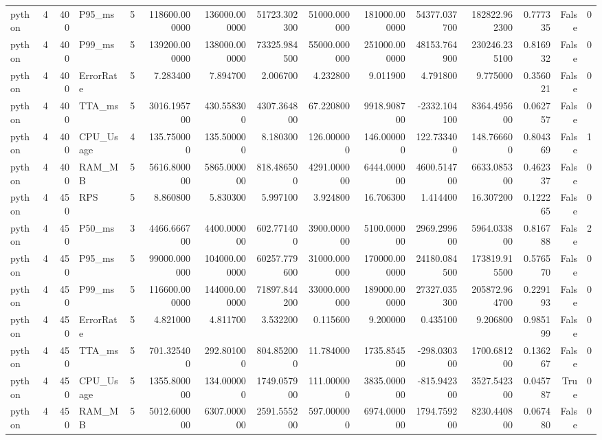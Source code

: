 \begin{tabular}{lrrlrrrrrrrrrrr}
python & 4 & 400 & P95_ms & 5 & 118600.000000 & 136000.000000 & 51723.302300 & 51000.000000 & 181000.000000 & 54377.037700 & 182822.962300 & 0.777335 & False & 0 \\
python & 4 & 400 & P99_ms & 5 & 139200.000000 & 138000.000000 & 73325.984500 & 55000.000000 & 251000.000000 & 48153.764900 & 230246.235100 & 0.816932 & False & 0 \\
python & 4 & 400 & ErrorRate & 5 & 7.283400 & 7.894700 & 2.006700 & 4.232800 & 9.011900 & 4.791800 & 9.775000 & 0.356021 & False & 0 \\
python & 4 & 400 & TTA_ms & 5 & 3016.195700 & 430.558300 & 4307.364800 & 67.220800 & 9918.908700 & -2332.104100 & 8364.495600 & 0.062757 & False & 0 \\
python & 4 & 400 & CPU_Usage & 4 & 135.750000 & 135.500000 & 8.180300 & 126.000000 & 146.000000 & 122.733400 & 148.766600 & 0.804369 & False & 1 \\
python & 4 & 400 & RAM_MB & 5 & 5616.800000 & 5865.000000 & 818.486500 & 4291.000000 & 6444.000000 & 4600.514700 & 6633.085300 & 0.462337 & False & 0 \\
python & 4 & 450 & RPS & 5 & 8.860800 & 5.830300 & 5.997100 & 3.924800 & 16.706300 & 1.414400 & 16.307200 & 0.122265 & False & 0 \\
python & 4 & 450 & P50_ms & 3 & 4466.666700 & 4400.000000 & 602.771400 & 3900.000000 & 5100.000000 & 2969.299600 & 5964.033800 & 0.816788 & False & 2 \\
python & 4 & 450 & P95_ms & 5 & 99000.000000 & 104000.000000 & 60257.779600 & 31000.000000 & 170000.000000 & 24180.084500 & 173819.915500 & 0.576570 & False & 0 \\
python & 4 & 450 & P99_ms & 5 & 116600.000000 & 144000.000000 & 71897.844200 & 33000.000000 & 189000.000000 & 27327.035300 & 205872.964700 & 0.229193 & False & 0 \\
python & 4 & 450 & ErrorRate & 5 & 4.821000 & 4.811700 & 3.532200 & 0.115600 & 9.200000 & 0.435100 & 9.206800 & 0.985199 & False & 0 \\
python & 4 & 450 & TTA_ms & 5 & 701.325400 & 292.801000 & 804.852000 & 11.784000 & 1735.854500 & -298.030300 & 1700.681200 & 0.136267 & False & 0 \\
python & 4 & 450 & CPU_Usage & 5 & 1355.800000 & 134.000000 & 1749.057900 & 111.000000 & 3835.000000 & -815.942300 & 3527.542300 & 0.045787 & True & 0 \\
python & 4 & 450 & RAM_MB & 5 & 5012.600000 & 6307.000000 & 2591.555200 & 597.000000 & 6974.000000 & 1794.759200 & 8230.440800 & 0.067480 & False & 0 \\

\end{tabular}
